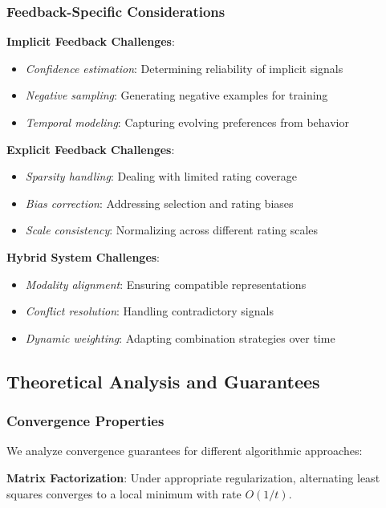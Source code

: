 \subsubsection{Feedback-Specific Considerations}

\textbf{Implicit Feedback Challenges}:
\begin{itemize}
    \item \textit{Confidence estimation}: Determining reliability of implicit signals
    \item \textit{Negative sampling}: Generating negative examples for training
    \item \textit{Temporal modeling}: Capturing evolving preferences from behavior
\end{itemize}

\textbf{Explicit Feedback Challenges}:
\begin{itemize}
    \item \textit{Sparsity handling}: Dealing with limited rating coverage
    \item \textit{Bias correction}: Addressing selection and rating biases
    \item \textit{Scale consistency}: Normalizing across different rating scales
\end{itemize}

\textbf{Hybrid System Challenges}:
\begin{itemize}
    \item \textit{Modality alignment}: Ensuring compatible representations
    \item \textit{Conflict resolution}: Handling contradictory signals
    \item \textit{Dynamic weighting}: Adapting combination strategies over time
\end{itemize}

\subsection{Theoretical Analysis and Guarantees}

\subsubsection{Convergence Properties}
We analyze convergence guarantees for different algorithmic approaches:

\textbf{Matrix Factorization}: Under appropriate regularization, alternating least squares converges to a local minimum with rate $O(1/t)$.


